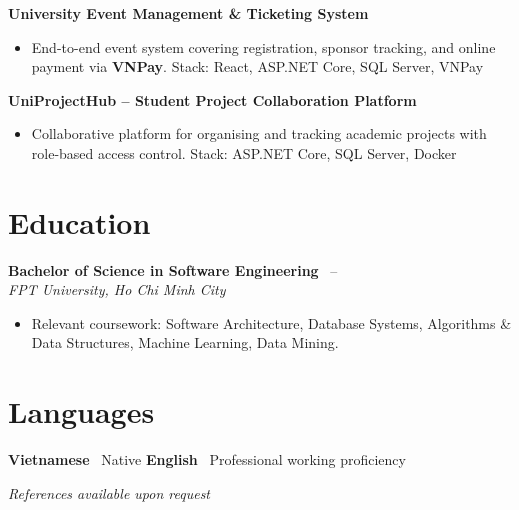 \documentclass[10.5pt,a4paper]{article}
\newcommand{\jobtitle}[4]{%
  \vspace{2pt}%
  {\bfseries #1} \hfill \textcolor{muted}{\small #3\ifx#4\empty\else\ -- #4\fi}\\%
  \textcolor{muted}{\small\itshape #2}%
  \vspace{2pt}%
}
\newcommand{\projrow}[2]{%
  \vspace{2pt}%
  {\bfseries #1}%
  \ifx#2\empty\else\ \hfill \textcolor{muted}{\small\itshape #2}\fi%
  \vspace{1pt}%
}
\begin{document}
\projrow{University Event Management \& Ticketing System}{}
\begin{itemize}
  \item End-to-end event system covering registration, sponsor tracking, and online payment via \textbf{VNPay}.
  Stack: React, ASP.NET Core, SQL Server, VNPay
\end{itemize}

\projrow{UniProjectHub -- Student Project Collaboration Platform}{}
\begin{itemize}
  \item Collaborative platform for organising and tracking academic projects with role-based access control.
  Stack: ASP.NET Core, SQL Server, Docker
\end{itemize}

\section{Education}

\jobtitle{Bachelor of Science in Software Engineering}{FPT University, Ho Chi Minh City}{}{}
\begin{itemize}
  \item Relevant coursework: Software Architecture, Database Systems, Algorithms \& Data Structures, Machine Learning, Data Mining.
\end{itemize}

\section{Languages}

\textbf{Vietnamese} \textemdash\ Native \qquad
\textbf{English} \textemdash\ Professional working proficiency

\vspace{6pt}
\begin{center}
  \textcolor{muted}{\small\itshape References available upon request}
\end{center}
\end{document}
